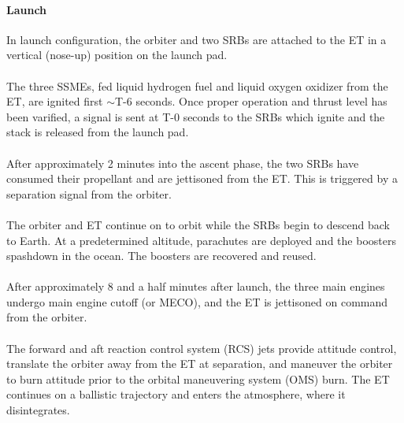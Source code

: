 \documentclass[13pt]{article}
\begin{document}
\begin{multicols}{2}
\paragraph{Launch}
In launch configuration, the orbiter and two SRBs are attached to the ET in a vertical (nose-up) position on the launch pad.\\
\\
The three SSMEs, fed liquid hydrogen fuel and liquid oxygen oxidizer from the ET, are ignited first $\sim$T-6 seconds. Once proper operation and thrust level has been varified, a signal is sent at T-0 seconds to the SRBs which ignite and the stack is released from the launch pad.\\
\\
After approximately 2 minutes into the ascent phase, the two SRBs have consumed their propellant and are jettisoned from the ET. This is triggered by a separation signal from the orbiter.\\
\\
The orbiter and ET continue on to orbit while the SRBs begin to descend back to Earth. At a predetermined altitude, parachutes are deployed and the boosters spashdown in the ocean.
The boosters are recovered and reused.\\
\\
After approximately 8 and a half minutes after launch, the three main engines undergo main engine cutoff (or MECO), and the ET is jettisoned on command from the orbiter.\\
\\
The forward and aft reaction control system (RCS) jets provide attitude control, translate the orbiter away from the ET at separation, and maneuver the orbiter to burn attitude prior to the orbital maneuvering system (OMS) burn. The ET continues on a ballistic trajectory and enters the atmosphere, where it disintegrates.\\
\\

\end{multicols}
\end{document}
